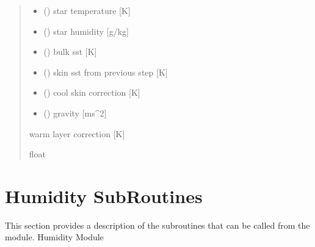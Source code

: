 \documentclass[letterpaper,10pt,english]{sphinxmanual}
\begin{document}
\begin{fulllineitems}
\begin{quote}
\begin{description}
\begin{itemize}
\item {}
\sphinxAtStartPar
{} () \textendash{} star temperature              {[}K{]}

\item {}
\sphinxAtStartPar
{} () \textendash{} star humidity                 {[}g/kg{]}

\item {}
\sphinxAtStartPar
{} () \textendash{} bulk sst                    {[}K{]}

\item {}
\sphinxAtStartPar
{} () \textendash{} skin sst from previous step {[}K{]}

\item {}
\sphinxAtStartPar
{} () \textendash{} cool skin correction        {[}K{]}

\item {}
\sphinxAtStartPar
{} () \textendash{} gravity                      {[}ms\textasciicircum{}\sphinxhyphen{}2{]}

\end{itemize}

\sphinxAtStartPar
{} \textendash{} warm layer correction       {[}K{]}

\sphinxAtStartPar
float

\end{description}\end{quote}

\end{fulllineitems}



\section{Humidity Sub\sphinxhyphen{}Routines}
\label{\detokenize{users_guide:humidity-sub-routines}}
\sphinxAtStartPar
This section provides a description of the sub\sphinxhyphen{}routines that can be called from the  module.
\label{\detokenize{users_guide:module-AirSeaFluxCode.hum_subs}}
\sphinxAtStartPar
Humidity Module
\end{document}
